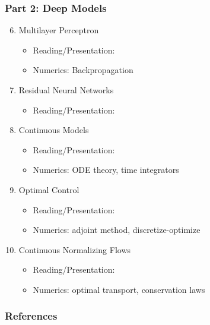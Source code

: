 \documentclass[12pt,fleqn]{beamer}
\begin{document}
\begin{frame}
\frametitle{Part 2: Deep Models}


\begin{enumerate}
	\setcounter{enumi}{5}
\item Multilayer Perceptron
\begin{itemize}
	\item Reading/Presentation: \cite{Rumelhart1986} 
	\item Numerics: Backpropagation
\end{itemize}
\item Residual Neural Networks
\begin{itemize}
	\item Reading/Presentation: \cite{he2016identity,he2016deep} 
\end{itemize}
\item Continuous Models
\begin{itemize}
	\item Reading/Presentation: \cite{E2017, ChenEtAl2018} 
	\item Numerics: ODE theory, time integrators
\end{itemize}
\item Optimal Control
\begin{itemize}
	\item Reading/Presentation: \cite{GholamiEtAl2019} 
	\item Numerics: adjoint method, discretize-optimize
\end{itemize}
\item Continuous Normalizing Flows
\begin{itemize}
	\item Reading/Presentation: \cite{Zhang:2018th,Grathwohl:2018vf}
	\item Numerics: optimal transport, conservation laws
\end{itemize}
\end{enumerate}
\end{frame}


\begin{frame}[allowframebreaks]
	\frametitle{References}



\end{frame}

\end{document}
